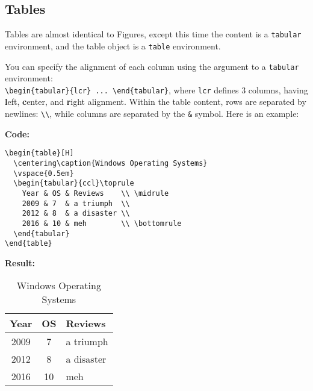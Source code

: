 \subsection{Tables}
Tables are almost identical to Figures, except this time the content is a \lstinline|tabular| environment,
and the table object is a \lstinline|table| environment.
\par
You can specify the alignment of each column using the argument to a \lstinline|tabular| environment:\\
\lstinline|\begin{tabular}{lcr} ... \end{tabular}|, where \lstinline|lcr| defines 3 columns, having
\textbf{l}eft, \textbf{c}enter, and \textbf{r}ight alignment.
Within the table content,
rows are separated by newlines: \lstinline|\\|, while
columns are separated by the \lstinline|&| symbol.
Here is an example:
\par
\textbf{Code:}
\begin{lstlisting}
\begin{table}[H]
  \centering\caption{Windows Operating Systems}
  \vspace{0.5em}
  \begin{tabular}{ccl}\toprule
  	Year & OS & Reviews    \\ \midrule
  	2009 & 7  & a triumph  \\
  	2012 & 8  & a disaster \\
  	2016 & 10 & meh        \\ \bottomrule
  \end{tabular}
\end{table}
\end{lstlisting}
\textbf{Result:}
\begin{table}[H]
  \centering\caption{Windows Operating Systems}
  \vspace{0.5em}
  \begin{tabular}{ccl}\toprule
  	Year & OS & Reviews    \\ \midrule
  	2009 & 7  & a triumph  \\
  	2012 & 8  & a disaster \\
  	2016 & 10 & meh        \\ \bottomrule
  \end{tabular}
\end{table}
